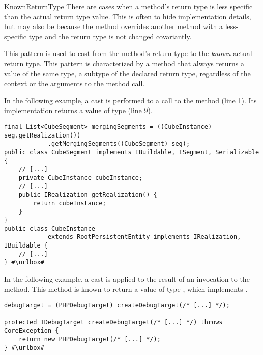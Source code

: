 \begin{pattern}{KnownReturnType}
There are cases when a method's return type is less specific than the actual return type value.
This is often to hide implementation details,
but may also be because the method overrides another method with a less-specific type and the return type is not changed covariantly.

This pattern is used to cast from the method's return type to the \emph{known} actual return type.
This pattern is characterized by a method that always returns a value of the same type,
a subtype of the declared return type,
regardless of the context or the arguments to the method call.

\instances{}
In the following example,
a cast is performed to a call to the  method (line 1).
Its implementation returns a value of type  (line 9).

\def\urlvar{http://bit.ly/apache_kylin_2SIjooO}
\begin{verbatim}
final List<CubeSegment> mergingSegments = ((CubeInstance) seg.getRealization())
            .getMergingSegments((CubeSegment) seg);
public class CubeSegment implements IBuildable, ISegment, Serializable {
    // [...]
    private CubeInstance cubeInstance;
    // [...]
    public IRealization getRealization() {
        return cubeInstance;
    }
}
public class CubeInstance
            extends RootPersistentEntity implements IRealization, IBuildable {
    // [...]
} #\urlbox#
\end{verbatim}

In the following example,
a cast is applied to the result of an invocation to the  method.
This method is known to return a value of type ,
which implements .

\def\urlvar{http://bit.ly/eclipse_pdt_2Ekeu9v}
\begin{verbatim}
debugTarget = (PHPDebugTarget) createDebugTarget(/* [...] */);

protected IDebugTarget createDebugTarget(/* [...] */) throws CoreException {
    return new PHPDebugTarget(/* [...] */);
} #\urlbox#
\end{verbatim}


\end{pattern}
